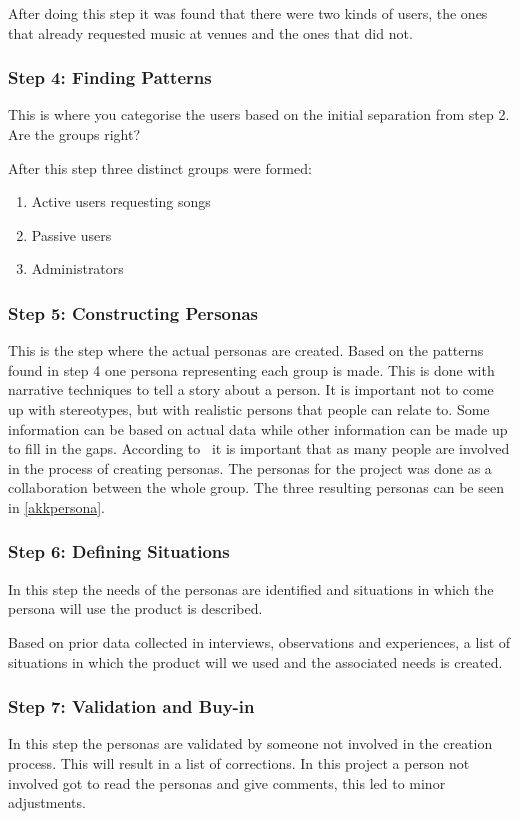 After doing this step it was found that there were two kinds of users, the ones that already requested music at venues and the ones that did not.

\subsubsection{Step 4: Finding Patterns}
This is where you categorise the users based on the initial separation from step 2. Are the groups right?

After this step three distinct groups were formed:
\begin{enumerate}
    \item Active users requesting songs
    \item Passive users
    \item Administrators
\end{enumerate}

\subsubsection{Step 5: Constructing Personas}
This is the step where the actual personas are created. Based on the patterns found in step 4 one persona representing each group is made. This is done with narrative techniques to tell a story about a person. It is important not to come up with stereotypes, but with realistic persons that people can relate to. Some information can be based on actual data while other information can be made up to fill in the gaps. According to~\cite{nielsen2007persona} it is important that as many people are involved in the process of creating personas. The personas for the project was done as a collaboration between the whole group. The three resulting personas can be seen in \cref{akkpersona}.

\subsubsection{Step 6: Defining Situations}
In this step the needs of the personas are identified and situations in which the persona will use the product is described. 

Based on prior data collected in interviews, observations and experiences, a list of situations in which the product will we used and the associated needs is created.

\subsubsection{Step 7: Validation and Buy-in}
In this step the personas are validated by someone not involved in the creation process. This will result in a list of corrections. In this project a person not involved got to read the personas and give comments, this led to minor adjustments.

